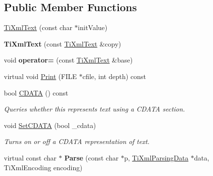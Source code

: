 \subsection*{\-Public \-Member \-Functions}
\begin{DoxyCompactItemize}
\item 
\hyperlink{classTiXmlText_af659e77c6b87d684827f35a8f4895960}{\-Ti\-Xml\-Text} (const char $\ast$init\-Value)
\item 
\hypertarget{classTiXmlText_a8d2cc1b4af2208cbb0171cf20f6815d1}{
{\bfseries \-Ti\-Xml\-Text} (const \hyperlink{classTiXmlText}{\-Ti\-Xml\-Text} \&copy)}
\label{d4/d9a/classTiXmlText_a8d2cc1b4af2208cbb0171cf20f6815d1}

\item 
\hypertarget{classTiXmlText_af5f15d40d048cea7cab9d0eb4fd8a7d2}{
void {\bfseries operator=} (const \hyperlink{classTiXmlText}{\-Ti\-Xml\-Text} \&base)}
\label{d4/d9a/classTiXmlText_af5f15d40d048cea7cab9d0eb4fd8a7d2}

\item 
virtual void \hyperlink{classTiXmlText_ae74d56c5b3ddec6cc3103dd51821af92}{\-Print} (\-F\-I\-L\-E $\ast$cfile, int depth) const 
\item 
\hypertarget{classTiXmlText_ad1a6a6b83fa2271022dd97c072a2b586}{
bool \hyperlink{classTiXmlText_ad1a6a6b83fa2271022dd97c072a2b586}{\-C\-D\-A\-T\-A} () const }
\label{d4/d9a/classTiXmlText_ad1a6a6b83fa2271022dd97c072a2b586}

\begin{DoxyCompactList}\small\item\em \-Queries whether this represents text using a \-C\-D\-A\-T\-A section. \end{DoxyCompactList}\item 
\hypertarget{classTiXmlText_acb17ff7c5d09b2c839393445a3de5ea9}{
void \hyperlink{classTiXmlText_acb17ff7c5d09b2c839393445a3de5ea9}{\-Set\-C\-D\-A\-T\-A} (bool \-\_\-cdata)}
\label{d4/d9a/classTiXmlText_acb17ff7c5d09b2c839393445a3de5ea9}

\begin{DoxyCompactList}\small\item\em \-Turns on or off a \-C\-D\-A\-T\-A representation of text. \end{DoxyCompactList}\item 
\hypertarget{classTiXmlText_a8d2dcfa41fc73d3e62dacc2fcf633819}{
virtual const char $\ast$ {\bfseries \-Parse} (const char $\ast$p, \hyperlink{classTiXmlParsingData}{\-Ti\-Xml\-Parsing\-Data} $\ast$data, \-Ti\-Xml\-Encoding encoding)}
\label{d4/d9a/classTiXmlText_a8d2dcfa41fc73d3e62dacc2fcf633819}


\end{DoxyCompactItemize}
